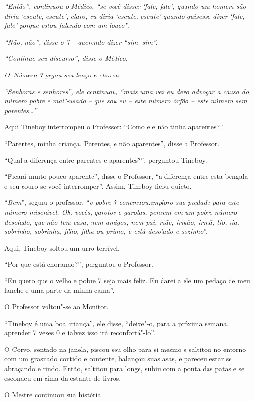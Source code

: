 \emph{``Então'', continuou o Médico, ``se você disser `fale, fale',
quando um homem são diria `escute, escute', claro, eu diria `escute,
escute' quando quisesse dizer `fale, fale' porque estou falando com um
louco''.}

\emph{``Não, não'', disse o 7 -- querendo dizer ``sim, sim''.}

\emph{``Continue seu discurso'', disse o Médico.}

\emph{O~Número 7 pegou seu lenço e chorou.}

\emph{``Senhoras e senhores'', ele continuou, ``mais uma vez eu devo
advogar a causa do número pobre e mal"-usado -- que sou eu -- este número
órfão -- este número sem parentes…''}

Aqui Tineboy interrompeu o Professor: ``Como ele não tinha aparentes?''

``Parentes, minha criança. Parentes, e não aparentes'', disse o
Professor.

``Qual a diferença entre parentes e aparentes?'', perguntou Tineboy.

``Ficará muito pouco aparente'', disse o Professor, ``a diferença entre
esta bengala e seu couro se você interromper''. Assim, Tineboy ficou
quieto.

``\emph{Bem}'', seguiu o professor, ``\emph{o pobre 7 continuou:imploro
sua piedade para este número miserável. Oh, vocês, garotos e garotas,
pensem em um pobre número desolado, que não tem casa, nem amigos, nem
pai, mãe, irmão, irmã, tio, tia, sobrinho, sobrinha, filho, filha ou
primo, e está desolado e sozinho}''.

Aqui, Tineboy soltou um urro terrível.

``Por que está chorando?'', perguntou o Professor.

``Eu quero que o velho e pobre 7 seja mais feliz. Eu darei a ele um
pedaço de meu lanche e uma parte da minha cama''.

O Professor voltou"-se ao Monitor.

``Tineboy é uma boa criança'', ele disse, ``deixe"-o, para a próxima
semana, aprender 7 vezes 0 e talvez isso irá reconfortá"-lo''.

O Corvo, sentado na janela, piscou seu olho para si mesmo e saltitou no
entorno com um grasnado contido e contente, balançou suas asas, e
pareceu estar se abraçando e rindo. Então, saltitou para longe, subiu
com a ponta das patas e se escondeu em cima da estante de livros.

O Mestre continuou sua história.

